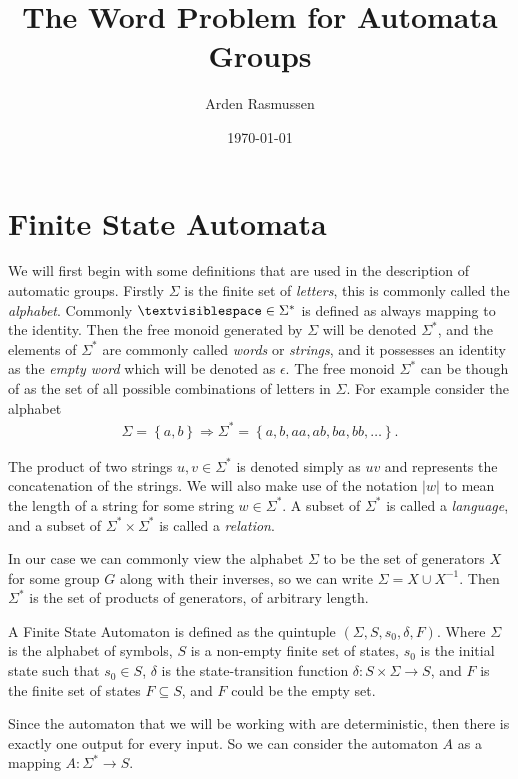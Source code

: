 \documentclass[10pt]{amsart}
\title{The Word Problem for Automata Groups}
\author{Arden Rasmussen}
\date{\today}
\theoremstyle{definition}
\renewcommand{\sp}{\textvisiblespace}
\begin{document}
\maketitle

\section{Finite State Automata}%
\label{sec:finite_state_automata}

We will first begin with some definitions that are used in the description of
automatic groups. Firstly $\Sigma$ is the finite set of \textit{letters}, this
is commonly called the \textit{alphabet}. Commonly $\sp\in\Sigma^*$ is defined
as always mapping to the identity. Then the free monoid generated by
$\Sigma$ will be denoted $\Sigma^*$, and the elements of $\Sigma^*$ are
commonly called \textit{words} or \textit{strings}, and it possesses an
identity as the \textit{empty word} which will be denoted as $\epsilon$. The
free monoid $\Sigma^*$ can be though of as the set of all possible combinations
of letters in $\Sigma$. For example consider the alphabet
\begin{align*}
  \Sigma=\left\{a,b\right\}\Rightarrow\Sigma^*=\left\{a,b,aa,ab,ba,bb,\ldots\right\}.
\end{align*}

The product of two strings $u,v\in\Sigma^*$ is denoted simply as $uv$ and
represents the concatenation of the strings. We will also make use of the
notation $|w|$ to mean the length of a string for some string $w\in\Sigma^*$. A
subset of $\Sigma^*$ is called a \textit{language}, and a subset of
$\Sigma^*\times\Sigma^*$ is called a \textit{relation}.

In our case we can commonly view the alphabet $\Sigma$ to be the set of
generators $X$ for some group $G$ along with their inverses, so we can write
$\Sigma=X\cup X^{-1}$. Then $\Sigma^*$ is the set of products of
generators, of arbitrary length.

A Finite State Automaton is defined as the quintuple $\left(\Sigma, S, s_0,
  \delta, F\right)$. Where $\Sigma$ is the alphabet of symbols, $S$ is a
non-empty finite set of states, $s_0$ is the initial state such that $s_0\in
S$, $\delta$ is the state-transition function $\delta:S\times\Sigma\rightarrow
S$, and $F$ is the finite set of states $F\subseteq S$, and $F$ could be the
empty set.

Since the automaton that we will be working with are deterministic, then there
is exactly one output for every input. So we can consider the automaton $A$ as
a mapping $A:\Sigma^*\rightarrow S$.
\end{document}
